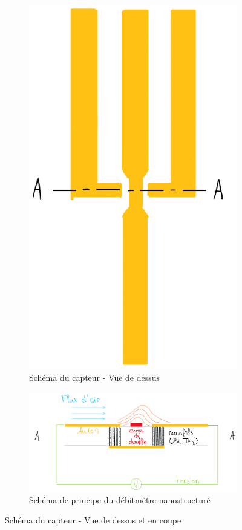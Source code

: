 \begin{figure}[H]
    \hspace{-0.7cm}
    \begin{subfigure}{0.4\textwidth}
        \includegraphics[scale = 0.3]{assets/figures/schema_capteur_vue_dessus.png}
        \caption{Schéma du capteur - Vue de dessus}
        \label{fig:schema_dessus}
    \end{subfigure}
    \begin{subfigure}{0.4\textwidth}
        \includegraphics[scale = 0.4]{images/CapteurFUN.png}
        \caption{Schéma de principe du débitmètre nanostructuré}
        \label{fig:schema_coupe}
    \end{subfigure}
    \caption{Schéma du capteur - Vue de dessus et en coupe}
\end{figure}
